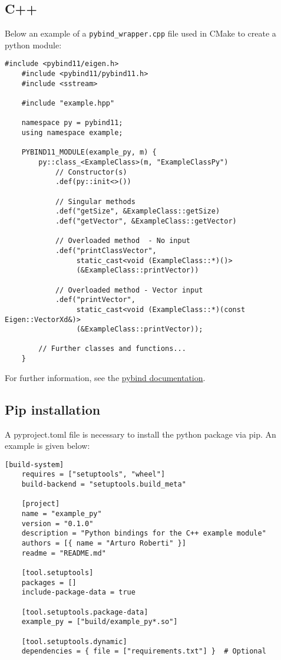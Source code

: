 \subsection{C++}
Below an example of a \texttt{pybind\_wrapper.cpp} file used in CMake to create a python module:
\begin{lstlisting}[style=CppStyle]
    #include <pybind11/eigen.h>
    #include <pybind11/pybind11.h>
    #include <sstream>

    #include "example.hpp"

    namespace py = pybind11;
    using namespace example;

    PYBIND11_MODULE(example_py, m) {
        py::class_<ExampleClass>(m, "ExampleClassPy")
            // Constructor(s)
            .def(py::init<>())

            // Singular methods
            .def("getSize", &ExampleClass::getSize)
            .def("getVector", &ExampleClass::getVector)

            // Overloaded method  - No input
            .def("printClassVector",
                 static_cast<void (ExampleClass::*)()>
                 (&ExampleClass::printVector))

            // Overloaded method - Vector input
            .def("printVector",
                 static_cast<void (ExampleClass::*)(const Eigen::VectorXd&)>
                 (&ExampleClass::printVector));

        // Further classes and functions...
    }
\end{lstlisting}
For further information, see the \href{https://pybind11.readthedocs.io/en/stable/}{pybind documentation}.

\subsection{Pip installation}
A pyproject.toml file is necessary to install the python package via pip. An example is given below:
\begin{lstlisting}[style=CmakeStyle]
    [build-system]
    requires = ["setuptools", "wheel"]
    build-backend = "setuptools.build_meta"

    [project]
    name = "example_py"
    version = "0.1.0"
    description = "Python bindings for the C++ example module"
    authors = [{ name = "Arturo Roberti" }]
    readme = "README.md"

    [tool.setuptools]
    packages = []
    include-package-data = true

    [tool.setuptools.package-data]
    example_py = ["build/example_py*.so"]

    [tool.setuptools.dynamic]
    dependencies = { file = ["requirements.txt"] }  # Optional
\end{lstlisting}

